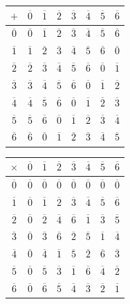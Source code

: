 \begin{exemple}
\begin{center}
\setlength{\tabcolsep}{5.5pt}
\renewcommand{\arraystretch}{1.12}
\begin{tabular}{c|ccccccc}
  $+$ & $\overline0$ & $\overline1$ & $\overline2$ & $\overline3$ & $\overline4$ & $\overline5$ & $\overline6$\\
  \hline
  $\overline0$ & $\overline0$ & $\overline1$ & $\overline2$ & $\overline3$ & $\overline4$ & $\overline5$ & $\overline6$\\
  $\overline1$ & $\overline1$ & $\overline2$ & $\overline3$ & $\overline4$ & $\overline5$ & $\overline6$ & $\overline0$\\
  $\overline2$ & $\overline2$ & $\overline3$ & $\overline4$ & $\overline5$ & $\overline6$ & $\overline0$ & $\overline1$\\
  $\overline3$ & $\overline3$ & $\overline4$ & $\overline5$ & $\overline6$ & $\overline0$ & $\overline1$ & $\overline2$\\
  $\overline4$ & $\overline4$ & $\overline5$ & $\overline6$ & $\overline0$ & $\overline1$ & $\overline2$ & $\overline3$\\
  $\overline5$ & $\overline5$ & $\overline6$ & $\overline0$ & $\overline1$ & $\overline2$ & $\overline3$ & $\overline4$\\
  $\overline6$ & $\overline6$ & $\overline0$ & $\overline1$ & $\overline2$ & $\overline3$ & $\overline4$ & $\overline5$\\
\end{tabular}
\quad
\begin{tabular}{c|ccccccc}
  $\times$ & $\overline0$ & $\overline1$ & $\overline2$ & $\overline3$ & $\overline4$ & $\overline5$ & $\overline6$\\
  \hline
  $\overline0$ & $\overline0$ & $\overline0$ & $\overline0$ & $\overline0$ & $\overline0$ & $\overline0$ & $\overline0$\\
  $\overline1$ & $\overline0$ & $\overline1$ & $\overline2$ & $\overline3$ & $\overline4$ & $\overline5$ & $\overline6$\\
  $\overline2$ & $\overline0$ & $\overline2$ & $\overline4$ & $\overline6$ & $\overline1$ & $\overline3$ & $\overline5$\\
  $\overline3$ & $\overline0$ & $\overline3$ & $\overline6$ & $\overline2$ & $\overline5$ & $\overline1$ & $\overline4$\\
  $\overline4$ & $\overline0$ & $\overline4$ & $\overline1$ & $\overline5$ & $\overline2$ & $\overline6$ & $\overline3$\\
  $\overline5$ & $\overline0$ & $\overline5$ & $\overline3$ & $\overline1$ & $\overline6$ & $\overline4$ & $\overline2$\\
  $\overline6$ & $\overline0$ & $\overline6$ & $\overline5$ & $\overline4$ & $\overline3$ & $\overline2$ & $\overline1$\\
\end{tabular}
\end{center}


\end{exemple}
